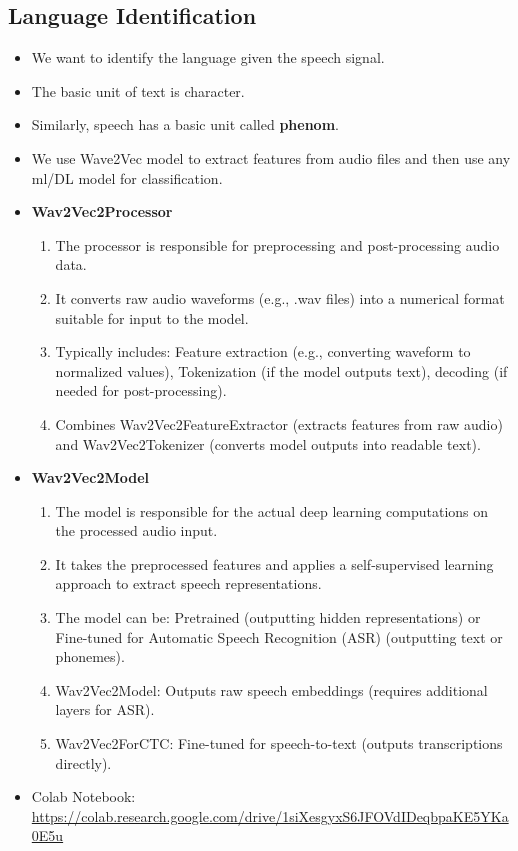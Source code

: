 \documentclass[a4paper]{article}
\begin{document}
\subsection{Language Identification}
\begin{itemize}
    \item We want to identify the language given the speech signal.
    \item The basic unit of text is character.
    \item Similarly, speech has a basic unit called \textbf{phenom}.
    \item We use Wave2Vec model to extract features from audio files and then use any ml/DL model for classification.
    \item \textbf{Wav2Vec2Processor}
    \begin{enumerate}
        \item The processor is responsible for preprocessing and post-processing audio data.
        \item It converts raw audio waveforms (e.g., .wav files) into a numerical format suitable for input to the model.
        \item Typically includes: Feature extraction (e.g., converting waveform to normalized values), Tokenization (if the model outputs text), decoding (if needed for post-processing).
        \item Combines Wav2Vec2FeatureExtractor (extracts features from raw audio) and Wav2Vec2Tokenizer (converts model outputs into readable text).
    \end{enumerate}
    \item \textbf{Wav2Vec2Model}
    \begin{enumerate}
        \item The model is responsible for the actual deep learning computations on the processed audio input.
        \item It takes the preprocessed features and applies a self-supervised learning approach to extract speech representations.
        \item The model can be: Pretrained (outputting hidden representations) or Fine-tuned for Automatic Speech Recognition (ASR) (outputting text or phonemes).
        \item Wav2Vec2Model: Outputs raw speech embeddings (requires additional layers for ASR).
        \item Wav2Vec2ForCTC: Fine-tuned for speech-to-text (outputs transcriptions directly).
    \end{enumerate}
    \item Colab Notebook: \url{https://colab.research.google.com/drive/1siXesgyxS6JFOVdIDeqbpaKE5YKa0E5u}
\end{itemize}
\end{document}
